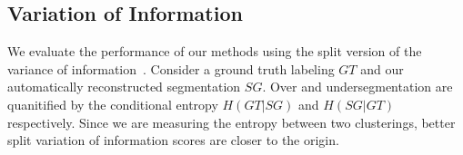 \subsection{Variation of Information}

We evaluate the performance of our methods using the split version of the variance of information~\cite{meila2003comparing}. 
Consider a ground truth labeling $GT$ and our automatically reconstructed segmentation $SG$. 
Over and undersegmentation are quanitified by the conditional entropy $H(GT | SG)$ and $H(SG | GT)$ respectively. 
Since we are measuring the entropy between two clusterings, better split variation of information scores are closer to the origin.